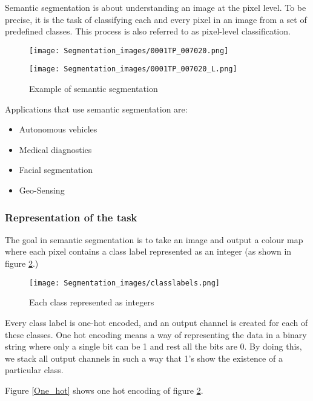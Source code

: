 Semantic segmentation is about understanding an image at the pixel level. To be precise, it is the task of classifying each and every pixel in an image from a set of predefined classes. This process is also referred to as pixel-level classification.

\begin{figure}[h!]
\begin{multicols}{2}
    \texttt{[image: Segmentation\_images/0001TP\_007020.png]}\par \texttt{[image: Segmentation\_images/0001TP\_007020\_L.png]}\par
    \end{multicols}
\caption{Example of semantic segmentation}
\label{Example_segmentation}
\end{figure}
 
Applications that use semantic segmentation are: 

\begin{itemize}
    \item Autonomous vehicles
    \item Medical diagnostics
    \item Facial segmentation
    \item Geo-Sensing
\end{itemize}

\subsubsection{Representation of the task}

The goal in semantic segmentation is to take an image and output a colour map where each pixel contains a class label represented as an integer (as shown in figure \ref{classlabels}.)

\begin{figure}[h!]
    \centering
    \texttt{[image: Segmentation\_images/classlabels.png]}
    \caption{Each class represented as integers \cite{JJ}}
    \label{classlabels}
\end{figure} 

Every class label is one-hot encoded, and an output channel is created for each of these classes. One hot encoding means a way of representing the data in a binary string where only a single bit can be 1 and rest all the bits are 0. By doing this, we stack all output channels in such a way that 1's show the existence of a particular class.  

Figure \ref{One_hot} shows one hot encoding of figure \ref{classlabels}. 

